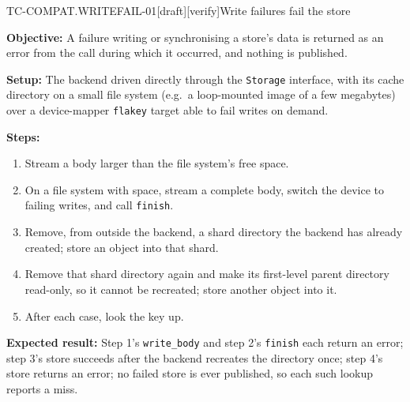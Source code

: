 \begin{requirement}{TC-COMPAT.WRITEFAIL-01}[draft][verify]{Write failures fail the store}


  \textbf{Objective:} A failure writing or synchronising a store's data is
  returned as an error from the call during which it occurred, and nothing is
  published.

  \textbf{Setup:} The backend driven directly through the \texttt{Storage}
  interface, with its cache directory on a small file system (e.g.\ a
  loop-mounted image of a few megabytes) over a device-mapper
  \texttt{flakey} target able to fail writes on demand.

  \textbf{Steps:}
  \begin{enumerate}
    \item Stream a body larger than the file system's free space.
    \item On a file system with space, stream a complete body, switch the
      device to failing writes, and call \texttt{finish}.
    \item Remove, from outside the backend, a shard directory the backend has
      already created; store an object into that shard.
    \item Remove that shard directory again and make its first-level parent
      directory read-only, so it cannot be recreated; store another object
      into it.
    \item After each case, look the key up.
  \end{enumerate}

  \textbf{Expected result:} Step 1's \texttt{write\_body} and step 2's
  \texttt{finish} each return an error; step 3's store succeeds after the
  backend recreates the directory once; step 4's store returns an error; no
  failed store is ever published, so each such lookup reports a miss.



\end{requirement}


